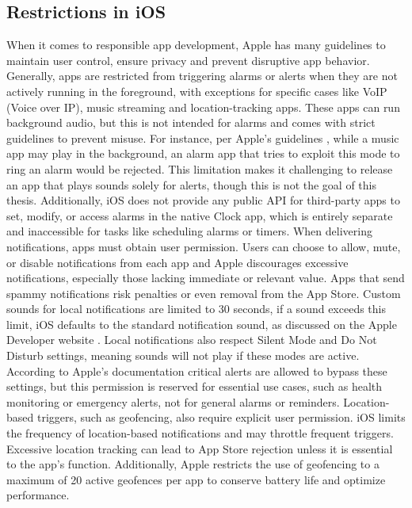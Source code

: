 \subsection{Restrictions in iOS}
When it comes to responsible app development, Apple has many guidelines to maintain user control, ensure privacy and prevent disruptive app behavior. Generally, apps are restricted from triggering alarms or alerts when they are not actively running in the foreground, with exceptions for specific cases like VoIP (Voice over IP), music streaming and location-tracking apps. These apps can run background audio, but this is not intended for alarms and comes with strict guidelines to prevent misuse. For instance, per Apple's guidelines \cite{apple_background_audio_guidelines}, while a music app may play in the background, an alarm app that tries to exploit this mode to ring an alarm would be rejected. This limitation makes it challenging to release an app that plays sounds solely for alerts, though this is not the goal of this thesis.
Additionally, iOS does not provide any public API for third-party apps to set, modify, or access alarms in the native Clock app, which is entirely separate and inaccessible for tasks like scheduling alarms or timers.
When delivering notifications, apps must obtain user permission. Users can choose to allow, mute, or disable notifications from each app and Apple discourages excessive notifications, especially those lacking immediate or relevant value. Apps that send spammy notifications risk penalties or even removal from the App Store. Custom sounds for local notifications are limited to 30 seconds, if a sound exceeds this limit, iOS defaults to the standard notification sound, as discussed on the Apple Developer website \cite{apple_sound_guidelines}. Local notifications also respect Silent Mode and Do Not Disturb settings, meaning sounds will not play if these modes are active. According to Apple's documentation \cite{apple_critical_alerts} critical alerts are allowed to bypass these settings, but this permission is reserved for essential use cases, such as health monitoring or emergency alerts, not for general alarms or reminders.
Location-based triggers, such as geofencing, also require explicit user permission. iOS limits the frequency of location-based notifications and may throttle frequent triggers. Excessive location tracking can lead to App Store rejection unless it is essential to the app's function. Additionally, Apple \cite{apple_geofencing_limits} restricts the use of geofencing to a maximum of 20 active geofences per app to conserve battery life and optimize performance.

